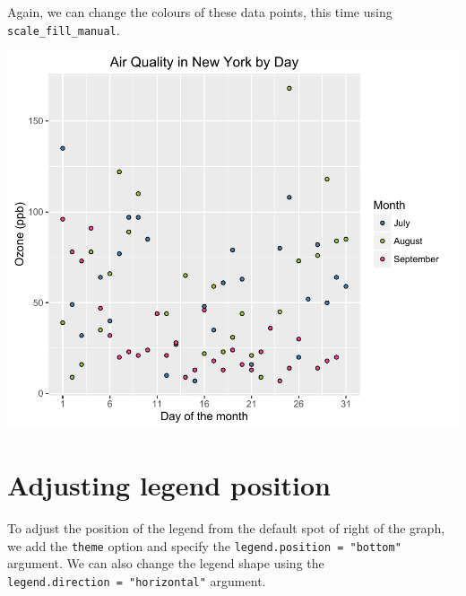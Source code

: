 Again, we can change the colours of these data points, this time using
\texttt{scale\_fill\_manual}.

\begin{Shaded}
\begin{Highlighting}[]
\StringTok{ }\NormalTok{(}\NormalTok{, }\NormalTok{, }\NormalTok{)}

\StringTok{ }\StringTok{ }\NormalTok{(} 
\end{Highlighting}
\end{Shaded}

\begin{center}\includegraphics[width=0.6\linewidth]{5_Scatter_Plots_pdf/scatter_10-1} \end{center}

\section{Adjusting legend position}\label{adjusting-legend-position}

To adjust the position of the legend from the default spot of right of
the graph, we add the \texttt{theme} option and specify the
\texttt{legend.position\ =\ "bottom"} argument. We can also change the
legend shape using the \texttt{legend.direction\ =\ "horizontal"}
argument.

\begin{Shaded}
\begin{Highlighting}[]
\StringTok{ }\StringTok{ }\NormalTok{(} \NormalTok{, } \NormalTok{)}
\end{Highlighting}
\end{Shaded}

